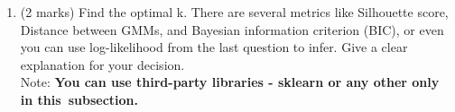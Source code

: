 \documentclass[addpoints,12pt,solution]{exam}
\begin{document}
\begin{questions}
\begin{enumerate}[label=(\alph*)]
\begin{solution}

\end{solution}

\item (2 marks)  Find the optimal k. There are several metrics like Silhouette score, Distance between GMMs, and Bayesian information criterion (BIC), or even you can use log-likelihood from the last question to infer. Give a clear explanation for your decision.\\
Note: \textbf{You can use third-party libraries - sklearn or any other only in this subsection.}

\begin{solution}


\end{solution}


\end{enumerate}







\end{questions}
\end{document}
